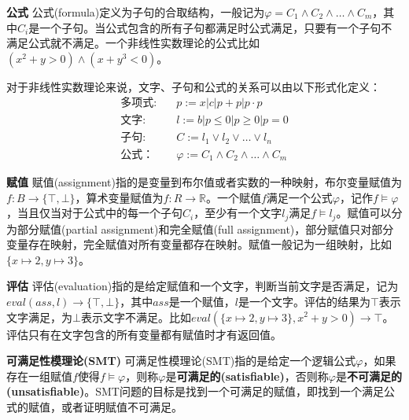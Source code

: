 \begin{definition}{\textbf{公式}}
公式(formula)定义为子句的合取结构，一般记为$\varphi = C_1 \wedge C_2 \wedge \dots \wedge C_m$，其中$C_i$是一个子句。当公式包含的所有子句都满足时公式满足，只要有一个子句不满足公式就不满足。一个非线性实数理论的公式比如$(x^2 + y > 0) \wedge (x + y^3 < 0)$。
\end{definition}

对于非线性实数理论来说，文字、子句和公式的关系可以由以下形式化定义：
\begin{align*}
\textbf{多项式:} \quad & p := x | c | p + p | p \cdot p \\
\textbf{文字:} \quad & l := b | p \leq 0 | p \geq 0 | p = 0 \\
\textbf{子句:} \quad & C := l_1 \vee l_2 \vee \dots \vee l_n \\
\textbf{公式：} \quad & \varphi := C_1 \wedge C_2 \wedge \dots \wedge C_m
\end{align*}


\begin{definition}{\textbf{赋值}}
赋值(assignment)指的是变量到布尔值或者实数的一种映射，布尔变量赋值为$f: B \rightarrow \{\top, \bot\}$，算术变量赋值为$f: R \rightarrow \mathbb{R}$。一个赋值$f$满足一个公式$\varphi$，记作$f \models \varphi$，当且仅当对于公式中的每一个子句$C_i$，至少有一个文字$l_j$满足$f \models l_j$。赋值可以分为部分赋值(partial assignment)和完全赋值(full assignment)，部分赋值只对部分变量存在映射，完全赋值对所有变量都存在映射。赋值一般记为一组映射，比如$\{x \mapsto 2, y \mapsto 3\}$。
\end{definition}

\begin{definition}{\textbf{评估}}
评估(evaluation)指的是给定赋值和一个文字，判断当前文字是否满足，记为$eval (ass, l) \rightarrow \{\top, \bot\}$，其中$ass$是一个赋值，$l$是一个文字。评估的结果为$\top$表示文字满足，为$\bot$表示文字不满足。比如$eval (\{x \mapsto 2, y \mapsto 3\}, x^2 + y > 0) \rightarrow \top$。评估只有在文字包含的所有变量都有赋值时才有返回值。
\end{definition}

\begin{definition}{\textbf{可满足性模理论(SMT)}}
可满足性模理论(SMT)指的是给定一个逻辑公式$\varphi$，如果存在一组赋值$f$使得$f \models \varphi$，则称$\varphi$是\textbf{可满足的(satisfiable)}，否则称$\varphi$是\textbf{不可满足的(unsatisfiable)}。SMT问题的目标是找到一个可满足的赋值，即找到一个满足公式的赋值，或者证明赋值不可满足。
\end{definition}

